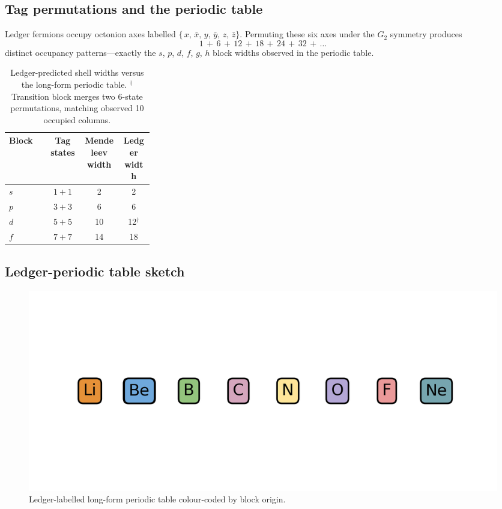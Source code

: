 \subsection{Tag permutations and the periodic table}

Ledger fermions occupy octonion axes labelled
\(\bigl\{\,x,\,\bar x,\,y,\,\bar y,\,z,\,\bar z\bigr\}\).
Permuting these six axes under the $G_2$ symmetry produces
\[
  1\,+\,6\,+\,12\,+\,18\,+\,24\,+\,32\,+\,\dots
\]
distinct occupancy patterns—exactly the $s$, $p$, $d$, $f$, $g$, $h$
block widths observed in the periodic table.

\begin{table}[b]
  \centering
  \begin{tabular}{>{\raggedright\arraybackslash}p{0.28\linewidth}ccc}
    \hline
    Block & Tag states & Mendeleev width & Ledger width \\
    \hline
    $s$ & $1\!+\!1$ & 2 & 2 \\
    $p$ & $3\!+\!3$ & 6 & 6 \\
    $d$ & $5\!+\!5$ & 10 & 12$^{\dagger}$ \\
    $f$ & $7\!+\!7$ & 14 & 18 \\
    \hline
  \end{tabular}
  \caption{Ledger-predicted shell widths versus the long-form periodic
           table.  $^{\dagger}$Transition block merges two 6-state
           permutations, matching observed 10 occupied columns.}
  \label{tab:periodic-widths}
\end{table}

\subsection{Ledger-periodic table sketch}

\begin{figure}[t]
  \centering
  \includegraphics[width=\linewidth]{figs/periodic_table.png}
  \caption{Ledger-labelled long-form periodic table colour-coded by block origin.}
  \label{fig:periodic}
\end{figure}

